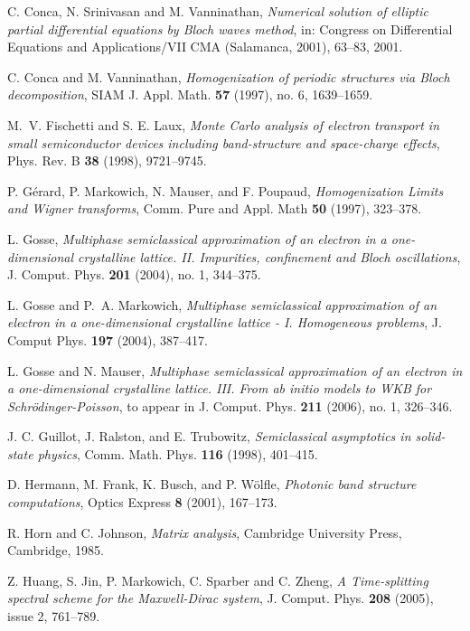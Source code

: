 \documentclass[leqno,final]{siamltex}
\numberwithin{equation}{section}
\newcounter{me}
\begin{document}
\begin{thebibliography}{99}
 C. Conca, N. Srinivasan and M. Vanninathan,
\emph{Numerical solution of elliptic partial differential
equations by Bloch waves method}, in:  Congress on Differential
Equations and Applications/VII CMA (Salamanca, 2001), 63--83,
2001.

 C. Conca and M. Vanninathan,
\emph{Homogenization of periodic structures via Bloch
decomposition}, SIAM J. Appl. Math. {\bf 57} (1997), no. 6,
1639--1659.

 M.~V. Fischetti and S. E. Laux,
\emph{Monte Carlo analysis of electron transport in small semiconductor
devices including band-structure and space-charge effects},
Phys. Rev. B {\bf 38} (1998), 9721--9745.

 P. G\'erard, P. Markowich, N. Mauser, and F. Poupaud,
\emph{Homogenization Limits and Wigner transforms},
Comm. Pure and Appl. Math {\bf 50} (1997), 323--378.

 L. Gosse, \emph{Multiphase semiclassical approximation
of an electron in a one-dimensional crystalline lattice. II.
Impurities, confinement and Bloch oscillations}, J. Comput. Phys.
{\bf 201} (2004), no. 1, 344--375.

 L. Gosse and P.~A. Markowich, \emph{Multiphase
semiclassical approximation of an electron in a one-dimensional
crystalline lattice - I. Homogeneous problems}, J. Comput Phys.
\textbf{197} (2004), 387--417.

 L. Gosse and N. Mauser, \emph{Multiphase semiclassical
approximation of an electron in a one-dimensional crystalline
lattice. III. From ab initio models to WKB for
Schr\"odinger-Poisson}, to appear in J. Comput. Phys. {\bf 211}
(2006), no. 1, 326--346.

 J. C. Guillot, J. Ralston, and E. Trubowitz,
\emph{Semiclassical asymptotics in solid-state physics}, Comm.
Math. Phys. \textbf{116} (1998), 401--415.

 D. Hermann, M. Frank, K. Busch, and P. W\"olfle,
\emph{Photonic band structure computations},
Optics Express {\bf 8} (2001), 167--173.

R. Horn and C. Johnson, \emph{Matrix analysis},
Cambridge University Press, Cambridge, 1985.

 Z. Huang, S. Jin, P. Markowich, C. Sparber and C. Zheng,
\emph{A Time-splitting spectral scheme for the Maxwell-Dirac
system}, J. Comput. Phys. {\bf 208} (2005), issue 2, 761--789.


\end{thebibliography}
\end{document}
